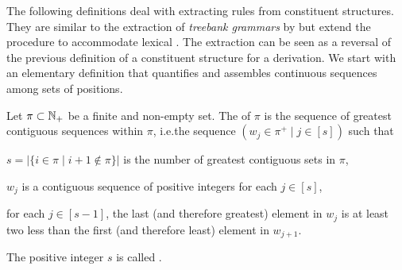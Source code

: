 \documentclass[../../document.tex]{subfiles}
\begin{document}
    \null\hfill
    \hfill
    \hfill\exampleqed

    \vspace{\baselineskip}

    The following definitions deal with extracting  rules from constituent structures.
    They are similar to the extraction of \emph{treebank grammars} by \citet{MaierSogaard08} but extend the procedure to accommodate lexical .
    The extraction can be seen as a reversal of the previous definition of a constituent structure for a derivation.
    We start with an elementary definition that quantifies and assembles continuous sequences among sets of positions.

    \begin{definition}[Linearization]
        Let \(\pi \subset \mathbb{N}_+\) be a finite and non-empty set.
        The  of \(\pi\) is the sequence of greatest contiguous sequences within \(\pi\), i.e.\@ the sequence \((w_j \in \pi^+ \mid j \in [s])\) such that
        \begin{compactitem}
            \item \(s = |\{i \in \pi \mid i+1 \notin \pi\}|\) is the number of greatest contiguous sets in \(\pi\),
            \item \(w_j\) is a contiguous sequence of positive integers for each \(j \in [s]\),
            \item for each \(j \in [s-1]\), the last (and therefore greatest) element in \(w_j\) is at least two less than the first (and therefore least) element in \(w_{j+1}\).
        \end{compactitem}
        The positive integer \(s\) is called .
    \end{definition}
\end{document}

